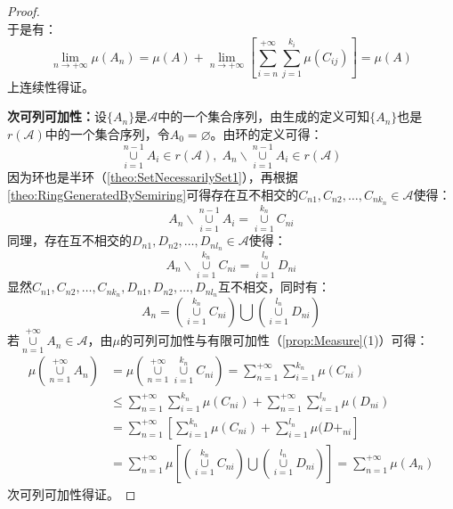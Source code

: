 \begin{proof}
\begin{equation*}
	\end{equation*}
	于是有：
	\begin{equation*}
		\lim_{n\to+\infty}\mu(A_n)=\mu(A)+\lim_{n\to+\infty}\left[\sum_{i=n}^{+\infty}\sum_{j=1}^{k_i}\mu(C_{ij})\right]=\mu(A)
	\end{equation*}
	上连续性得证。\par
	\textbf{次可列可加性：}设$\{A_n\}$是$\mathscr{A}$中的一个集合序列，由生成的定义可知$\{A_n\}$也是$r(\mathscr{A})$中的一个集合序列，令$A_0=\varnothing$。由环的定义可得：
	\begin{equation*}
		\underset{i=1}{\overset{n-1}{\cup}}A_i\in r(\mathscr{A}),\;A_n\backslash\underset{i=1}{\overset{n-1}{\cup}}A_i\in r(\mathscr{A})
	\end{equation*}
	因为环也是半环（\cref{theo:SetNecessarilySet1}），再根据\cref{theo:RingGeneratedBySemiring}可得存在互不相交的$C_{n1},C_{n2},\dots,C_{nk_n}\in\mathscr{A}$使得：
	\begin{equation*}
		A_n\backslash\underset{i=1}{\overset{n-1}{\cup}}A_i=\underset{i=1}{\overset{k_n}{\cup}}C_{ni}
	\end{equation*}
	同理，存在互不相交的$D_{n1},D_{n2},\dots,D_{nl_n}\in\mathscr{A}$使得：
	\begin{equation*}
		A_n\backslash\underset{i=1}{\overset{k_n}{\cup}}C_{ni}=\underset{i=1}{\overset{l_n}{\cup}}D_{ni}
	\end{equation*}
	显然$C_{n1},C_{n2},\dots,C_{nk_n},D_{n1},D_{n2},\dots,D_{nl_n}$互不相交，同时有：
	\begin{equation*}
		A_n=\left(\underset{i=1}{\overset{k_n}{\cup}}C_{ni}\right)\bigcup\left(\underset{i=1}{\overset{l_n}{\cup}}D_{ni}\right)
	\end{equation*}
	若$\underset{n=1}{\overset{+\infty}{\cup}}A_n\in\mathscr{A}$，由$\mu$的可列可加性与有限可加性（\cref{prop:Measure}(1)）可得：
	\begin{align*}
		\mu\left(\underset{n=1}{\overset{+\infty}{\cup}}A_n\right)
		&=\mu\left(\underset{n=1}{\overset{+\infty}{\cup}}\underset{i=1}{\overset{k_n}{\cup}}C_{ni}\right) =\sum_{n=1}^{+\infty}\sum_{i=1}^{k_n}\mu(C_{ni}) \\
		&\leqslant\sum_{n=1}^{+\infty}\sum_{i=1}^{k_n}\mu(C_{ni})+\sum_{n=1}^{+\infty}\sum_{i=1}^{l_n}\mu(D_{ni}) \\
		&=\sum_{n=1}^{+\infty}\left[\sum_{i=1}^{k_n}\mu(C_{ni})+\sum_{i=1}^{l_n}\mu(D+_{ni}\right] \\
		&=\sum_{n=1}^{+\infty}\mu\left[\left(\underset{i=1}{\overset{k_n}{\cup}}C_{ni}\right)\bigcup\left(\underset{i=1}{\overset{l_n}{\cup}}D_{ni}\right)\right]=\sum_{n=1}^{+\infty}\mu(A_n)
	\end{align*}
	次可列可加性得证。
\end{proof}
